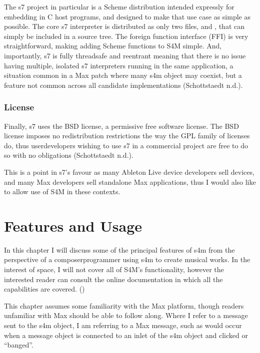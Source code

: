 \documentclass[letterpaper,10pt,english]{sphinxmanual}
\begin{document}
\sphinxAtStartPar
The s7 project in particular is a Scheme distribution intended expressly for embedding in C host programs, and
designed to make that use case as simple as possible.
The core s7 interpreter is distributed as only two files,  and , that can simply be included in a source tree.
The foreign function interface (FFI) is very straightforward, making adding Scheme functions to S4M simple.
And, importantly, s7 is fully thread\sphinxhyphen{}safe and re\sphinxhyphen{}entrant \sphinxhyphen{} meaning that there is no issue having multiple, isolated s7 interpreters
running in the same application, a situation common in a Max patch where many s4m object may coexist, but a feature
not common across all candidate implementations (Schottstaedt n.d.).


\subsection{License}
\label{\detokenize{design:license}}
\sphinxAtStartPar
Finally, s7 uses the BSD license, a permissive free software license.
The BSD license imposes no redistribution restrictions the way the GPL family of licenses do, thus user\sphinxhyphen{}developers wishing to
use s7 in a commercial project are free to do so with no obligations (Schottstaedt n.d.).

\sphinxAtStartPar
This is a point in s7’s favour as many Ableton Live device developers sell devices, and many Max developers sell standalone Max
applications, thus I would also like to allow use of S4M in these contexts.

\sphinxstepscope


\chapter{Features and Usage}
\label{\detokenize{features_usage:features-and-usage}}\label{\detokenize{features_usage::doc}}
\sphinxAtStartPar
In this chapter I will discuss some of the principal features of s4m from the perspective of a composer\sphinxhyphen{}programmer
using s4m to create musical works.
In the interest of space, I will not cover all of S4M’s functionality, however the interested
reader can consult the online documentation in which all the capabilities are covered.
()

\sphinxAtStartPar
This chapter assumes some familiarity with the Max platform, though readers unfamiliar with Max should be able to follow along.
Where I refer to a message sent to the s4m object, I am referring to a Max message, such as would occur
when a message object is connected to an inlet of the s4m object and clicked or “banged”.
\end{document}
